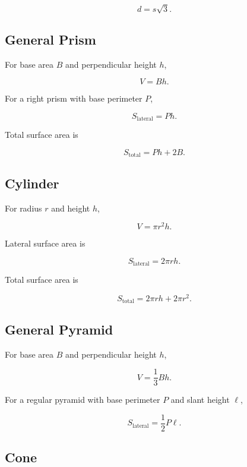 \[
\boxed{
d=s\sqrt3.
}
\]

\subsection{General Prism}
\label{subsec:general-prism-formulas}

For base area \(B\) and perpendicular height \(h\),

\[
\boxed{
V=Bh.
}
\]

For a right prism with base perimeter \(P\),

\[
\boxed{
S_{\mathrm{lateral}}
=
Ph.
}
\]

Total surface area is

\[
\boxed{
S_{\mathrm{total}}
=
Ph+2B.
}
\]

\subsection{Cylinder}
\label{subsec:cylinder-formulas}

For radius \(r\) and height \(h\),

\[
\boxed{
V
=
\pi r^2h.
}
\]

Lateral surface area is

\[
\boxed{
S_{\mathrm{lateral}}
=
2\pi rh.
}
\]

Total surface area is

\[
\boxed{
S_{\mathrm{total}}
=
2\pi rh+2\pi r^2.
}
\]

\subsection{General Pyramid}
\label{subsec:pyramid-formulas}

For base area \(B\) and perpendicular height \(h\),

\[
\boxed{
V
=
\frac13Bh.
}
\]

For a regular pyramid with base perimeter \(P\) and slant height \(\ell\),

\[
\boxed{
S_{\mathrm{lateral}}
=
\frac12P\ell.
}
\]

\subsection{Cone}
\label{subsec:cone-formulas}

